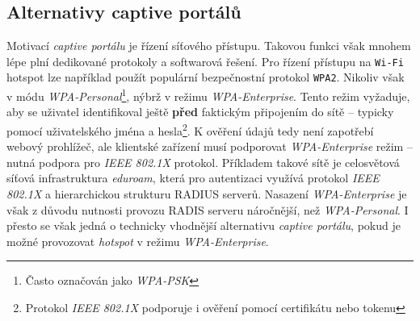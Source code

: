 \documentclass[thesis=M,czech]{FITthesis}[2012/10/20]
\begin{document}
%

\subsection{Alternativy captive portálů}

Motivací \textit{captive portálu} je řízení síťového přístupu. Takovou funkci však mnohem lépe\cite{bakalarka-srovnani-captive-fwall-nac} plní dedikované protokoly a softwarová řešení. Pro řízení přístupu na \texttt{Wi-Fi} hotspot lze například použít populární bezpečnostní protokol \texttt{WPA2}. Nikoliv však v módu \textit{WPA-Personal}\footnote{Často označován jako \textit{WPA-PSK}}, nýbrž v režimu \textit{WPA-Enterprise}. Tento režim vyžaduje, aby se uživatel identifikoval ještě \textbf{před} faktickým připojením do sítě -- typicky pomocí uživatelského jména a hesla\footnote{Protokol \textit{IEEE 802.1X} podporuje i ověření pomocí certifikátu nebo tokenu}. K ověření údajů tedy není zapotřebí webový prohlížeč, ale klientské zařízení musí podporovat \textit{WPA-Enterprise} režim -- nutná podpora pro \textit{IEEE 802.1X} protokol. Příkladem takové sítě je celosvětová síťová infrastruktura \textit{eduroam}, která pro autentizaci využívá protokol \textit{IEEE 802.1X} a hierarchickou strukturu RADIUS serverů. Nasazení \textit{WPA-Enterprise} je však z důvodu nutnosti provozu RADIS serveru náročnější, než \textit{WPA-Personal}. I přesto se však jedná o technicky vhodnější alternativu \textit{captive portálu}, pokud je možné provozovat \textit{hotspot} v režimu \textit{WPA-Enterprise}.


\end{document}
